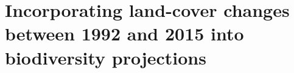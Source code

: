 \chapter{Incorporating land-cover changes between 1992 and 2015 into biodiversity projections }
\label{C04}

